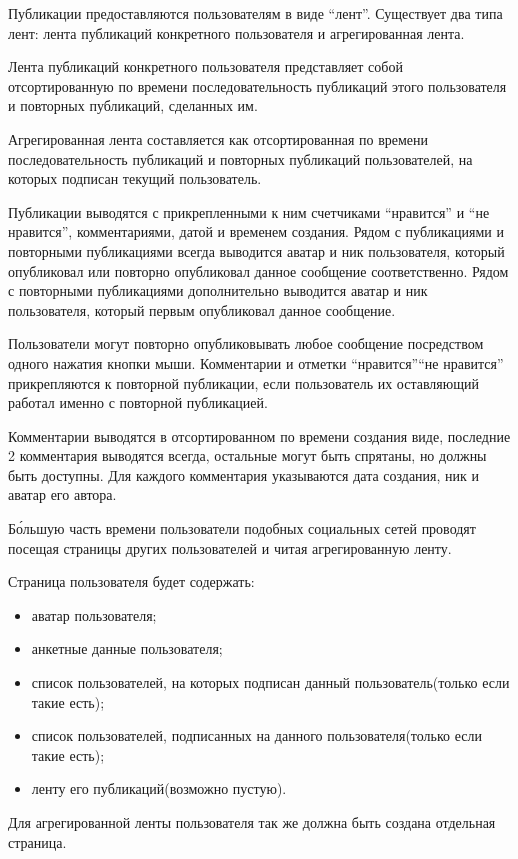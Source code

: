 Публикации предоставляются пользователям в виде ``лент''.
Существует два типа лент: лента публикаций конкретного пользователя и 
агрегированная лента.

Лента публикаций конкретного пользователя представляет собой отсортированную 
по времени последовательность публикаций этого пользователя и повторных
публикаций, сделанных им.

Агрегированная лента составляется как отсортированная по времени
последовательность публикаций и повторных публикаций пользователей,
на которых подписан текущий пользователь. 

Публикации выводятся с прикрепленными к ним 
счетчиками ``нравится'' и ``не нравится'', комментариями, датой и временем создания.
Рядом с публикациями и повторными публикациями всегда выводится аватар и ник
пользователя, который опубликовал или повторно опубликовал данное
сообщение соответственно.
Рядом с повторными публикациями дополнительно выводится аватар и ник пользователя,
который первым опубликовал данное сообщение.

Пользователи могут повторно опубликовывать любое сообщение посредством одного
нажатия кнопки мыши.
Комментарии и отметки ``нравится''\/``не нравится'' прикрепляются к повторной публикации,
если пользователь их оставляющий работал именно с повторной публикацией.


Комментарии выводятся в отсортированном по времени создания виде,
последние 2 комментария выводятся всегда,
остальные могут быть спрятаны, но должны быть доступны.
Для каждого комментария указываются дата создания, ник и аватар его автора.

Б\'{о}льшую часть времени пользователи подобных социальных сетей проводят
посещая страницы других пользователей и читая агрегированную ленту.

Страница пользователя будет содержать:
\begin{itemize}
\item аватар пользователя;
\item анкетные данные пользователя;
\item список пользователей, на которых подписан данный пользователь(только если такие есть);
\item список пользователей, подписанных на данного пользователя(только если такие есть);
\item ленту его публикаций(возможно пустую).
\end{itemize}

Для агрегированной ленты пользователя так же должна быть создана 
отдельная страница.

